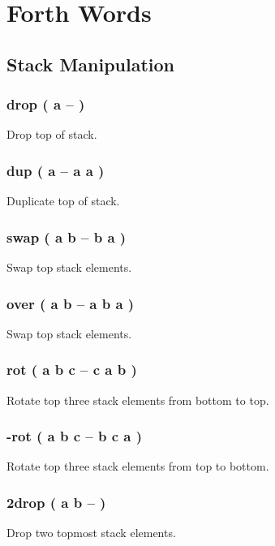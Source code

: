 \chapter{Forth Words}

\section{Stack Manipulation}

\subsection{drop ( a -- )}

Drop top of stack.

\subsection{dup ( a -- a a )}

Duplicate top of stack.

\subsection{swap ( a b -- b a )}

Swap top stack elements.

\subsection{over ( a b -- a b a )}

Swap top stack elements.

\subsection{rot ( a b c -- c a b )}

Rotate top three stack elements from bottom to top.

\subsection{-rot ( a b c -- b c a )}

Rotate top three stack elements from top to bottom.

\subsection{2drop ( a b -- )}

Drop two topmost stack elements.

